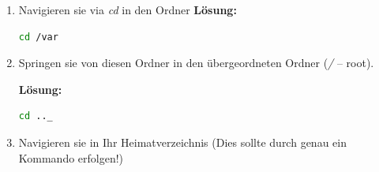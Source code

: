 \documentclass[paper=a4,fontsize=11pt]{scrartcl}%
\numberwithin{equation}{section}
\newenvironment{solution}
	{
		\color{blue}
		\textbf{Lösung:}
	}{}
\begin{document}
\begin{enumerate}
\begin{enumerate}[label=(\alph*)]
		\begin{solution}
		\begin{lstlisting}[style=Bash, language=Bash]
ls_
		\end{lstlisting}
		\end{solution}
		\item Navigieren sie via \emph{cd} in den Ordner 
		\begin{solution}
		\begin{lstlisting}[style=Bash, language=Bash]
cd /var
		\end{lstlisting}
		\end{solution}
		\item Springen sie von diesen Ordner in den übergeordneten Ordner (\emph{/} -- root).
		
		\begin{solution}
		\begin{lstlisting}[style=Bash, language=Bash]
cd .._
		\end{lstlisting}
		\end{solution}
		\item Navigieren sie in Ihr Heimatverzeichnis (Dies sollte durch genau ein Kommando erfolgen!)
		

\end{enumerate}
\end{enumerate}
\end{document}
